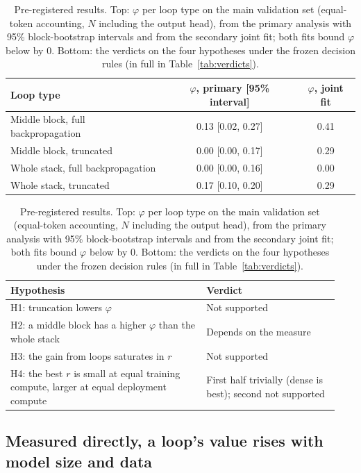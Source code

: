 \begin{table}[t]
  \centering
  \caption{Pre-registered results. Top: $\varphi$ per loop type on the main validation set (equal-token accounting, $N$
  including the output head), from the primary analysis with 95\% block-bootstrap intervals and from the secondary joint fit; both fits bound
  $\varphi$ below by 0. Bottom: the verdicts on the four hypotheses under the frozen decision rules (in full in
  Table~\ref{tab:verdicts}).}
  \label{tab:prereg}
  \footnotesize
  \begin{tabular}{lcc}
    \toprule
    Loop type & $\varphi$, primary [95\% interval] & $\varphi$, joint fit \\
    \midrule
    Middle block, full backpropagation & 0.13 [0.02, 0.27] & 0.41 \\
    Middle block, truncated            & 0.00 [0.00, 0.17] & 0.29 \\
    Whole stack, full backpropagation  & 0.00 [0.00, 0.16] & 0.00 \\
    Whole stack, truncated             & 0.17 [0.10, 0.20] & 0.29 \\
    \bottomrule
  \end{tabular}

  \vspace{0.5em}
  \begin{tabular}{>{\raggedright\arraybackslash}p{0.56\linewidth}>{\raggedright\arraybackslash}p{0.38\linewidth}}
    \toprule
    Hypothesis & Verdict \\
    \midrule
    H1: truncation lowers $\varphi$ & Not supported \\
    H2: a middle block has a higher $\varphi$ than the whole stack & Depends on the measure \\
    H3: the gain from loops saturates in $r$ & Not supported \\
    H4: the best $r$ is small at equal training compute, larger at equal deployment compute & First half trivially (dense is best); second not supported \\
    \bottomrule
  \end{tabular}
\end{table}

\subsection{Measured directly, a loop's value rises with model size and data}
\label{sec:multiplier}

